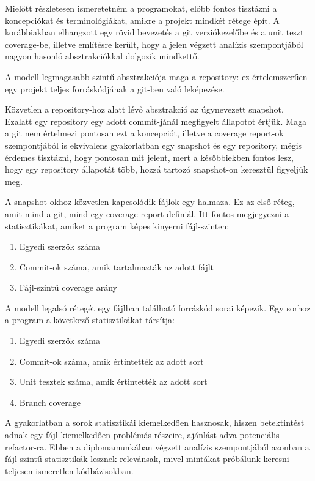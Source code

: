 Mielőtt részletesen ismeretetném a programokat, előbb fontos tisztázni a koncepciókat és terminológiákat, amikre a projekt mindkét rétege épít. A korábbiakban elhangzott egy rövid bevezetés a git verziókezelőbe és a unit teszt coverage-be, illetve említésre került, hogy a jelen végzett analízis szempontjából nagyon hasonló absztrakciókkal dolgozik mindkettő.

A modell legmagasabb szintű absztrakciója maga a repository: ez értelemszerűen egy projekt teljes forráskódjának a git-ben való leképezése.

Közvetlen a repository-hoz alatt lévő absztrakció az úgynevezett snapshot. Ezalatt egy repository egy adott commit-jánál megfigyelt állapotot értjük. Maga a git nem értelmezi pontosan ezt a koncepciót, illetve a coverage report-ok szempontjából is ekvivalens gyakorlatban egy snapshot és egy repository, mégis érdemes tisztázni, hogy pontosan mit jelent, mert a későbbiekben fontos lesz, hogy egy repository állapotát több, hozzá tartozó snapshot-on keresztül figyeljük meg.

A snapshot-okhoz közvetlen kapcsolódik fájlok egy halmaza. Ez az első réteg, amit mind a git, mind egy coverage report definiál. Itt fontos megjegyezni a statisztikákat, amiket a program képes kinyerni fájl-szinten:
\begin{enumerate}
    \item Egyedi szerzők száma
    \item Commit-ok száma, amik tartalmazták az adott fájlt
    \item Fájl-szintű coverage arány
\end{enumerate}

A modell legalsó rétegét egy fájlban található forráskód sorai képezik. Egy sorhoz a program a következő statisztikákat társítja:
\begin{enumerate}
    \item Egyedi szerzők száma
    \item Commit-ok száma, amik értintették az adott sort
    \item Unit tesztek száma, amik értintették az adott sort
    \item Branch coverage
\end{enumerate}

A gyakorlatban a sorok statisztikái kiemelkedően hasznosak, hiszen betektintést adnak egy fájl kiemelkedően problémás részeire, ajánlást adva potenciális refactor-ra. Ebben a diplomamunkában végzett analízis szempontjából azonban a fájl-szintű statisztikák lesznek relevánsak, mivel mintákat próbálunk keresni teljesen ismeretlen kódbázisokban.

